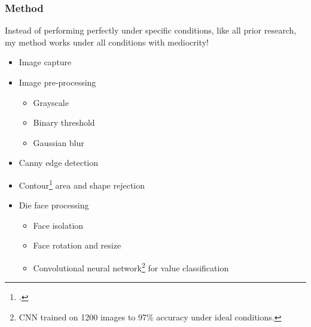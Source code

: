 \documentclass{beamer}
\begin{document}
\begin{frame}
\frametitle{Method}

Instead of performing perfectly under specific conditions, like all prior research, my method works under all conditions with mediocrity!

\begin{itemize}
	\item Image capture
	\item Image pre-processing
	\begin{itemize}
		\item Grayscale
		\item Binary threshold
		\item Gaussian blur
	\end{itemize}
	\item Canny edge detection
	\item Contour\footcite{Suzuki1985} area and shape rejection
	\item Die face processing
	\begin{itemize}
		\item Face isolation
		\item Face rotation and resize
		\item Convolutional neural network\footnote{CNN trained on 1200 images to 97\% accuracy under ideal conditions.} for value classification
	\end{itemize}
\end{itemize}

\end{frame}



\end{document}
